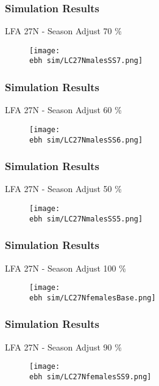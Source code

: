 \documentclass{beamer}
\newcommand{\ebh}{\string~/bio.data/bio.lobster/figures/LFA2733Framework2018/} %
\begin{document}
\begin{frame}
\frametitle{Simulation Results}
LFA 27N - Season Adjust 70 \%
\begin{figure}
        \begin{center}
            \texttt{[image: \\ebh sim/LC27NmalesSS7.png]}
        \end{center}
    \end{figure}
\end{frame}


\begin{frame}
\frametitle{Simulation Results}
LFA 27N - Season Adjust 60 \%
\begin{figure}
        \begin{center}
            \texttt{[image: \\ebh sim/LC27NmalesSS6.png]}
        \end{center}
    \end{figure}
\end{frame}


\begin{frame}
\frametitle{Simulation Results}
LFA 27N - Season Adjust 50 \%
\begin{figure}
        \begin{center}
            \texttt{[image: \\ebh sim/LC27NmalesSS5.png]}
        \end{center}
    \end{figure}
\end{frame}




\begin{frame}
\frametitle{Simulation Results}
LFA 27N - Season Adjust 100 \%
\begin{figure}
        \begin{center}
            \texttt{[image: \\ebh sim/LC27NfemalesBase.png]}
        \end{center}
    \end{figure}
\end{frame}


\begin{frame}
\frametitle{Simulation Results}
LFA 27N - Season Adjust 90 \%
\begin{figure}
        \begin{center}
            \texttt{[image: \\ebh sim/LC27NfemalesSS9.png]}
        \end{center}
    \end{figure}
\end{frame}
\end{document}
